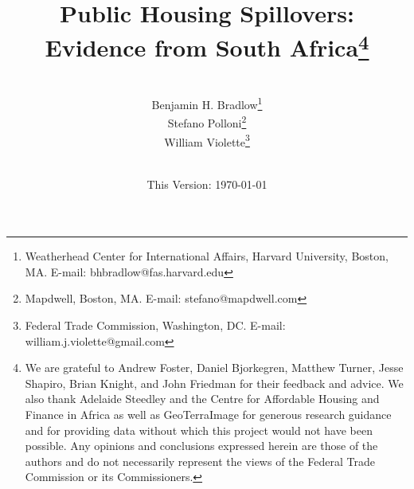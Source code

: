 \documentclass[12pt]{article}
\begin{document}
\begin{titlepage} 
\title{{Public Housing Spillovers: Evidence from South Africa}\thanks{We are grateful to Andrew Foster, Daniel Bjorkegren, Matthew Turner, Jesse Shapiro, Brian Knight, and John Friedman for their feedback and advice.  We also thank Adelaide Steedley and the Centre for Affordable Housing and Finance in Africa as well as GeoTerraImage for generous research guidance and for providing data without which this project would not have been possible.  Any opinions and conclusions expressed herein are those of the authors and do not necessarily represent the views of the Federal Trade Commission or its Commissioners.}}
\author{\\[3em] Benjamin H. Bradlow\thanks{Weatherhead Center for International Affairs, Harvard University, Boston, MA.  E-mail: bhbradlow@fas.harvard.edu}\\
 Stefano Polloni\thanks{Mapdwell, Boston, MA.  E-mail: stefano@mapdwell.com}\\ 
  William Violette\thanks{Federal Trade Commission, Washington, DC. E-mail: william.j.violette@gmail.com} \\
 \\ 
  }
\date{\vspace{5mm}This Version: \today}
\maketitle
\begin{abstract}









\end{abstract}
\end{titlepage}
\end{document}
